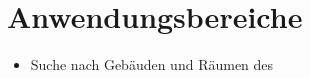 \section{Anwendungsbereiche}

\begin{itemize}
	\item Suche nach Gebäuden und Räumen des %
\end{itemize}